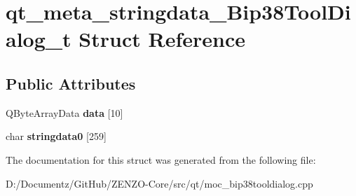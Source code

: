 \hypertarget{structqt__meta__stringdata___bip38_tool_dialog__t}{}\section{qt\+\_\+meta\+\_\+stringdata\+\_\+\+Bip38\+Tool\+Dialog\+\_\+t Struct Reference}
\label{structqt__meta__stringdata___bip38_tool_dialog__t}
\subsection*{Public Attributes}
\begin{DoxyCompactItemize}
\item 
\mbox{\label{structqt__meta__stringdata___bip38_tool_dialog__t_aa66a85840d0c5aae7f40a54980740b2a}} 
Q\+Byte\+Array\+Data {\bfseries data} \mbox{[}10\mbox{]}
\item 
\mbox{\label{structqt__meta__stringdata___bip38_tool_dialog__t_aa6bf5da3a65ebcfd760018b1f311d955}} 
char {\bfseries stringdata0} \mbox{[}259\mbox{]}
\end{DoxyCompactItemize}


The documentation for this struct was generated from the following file\+:\begin{DoxyCompactItemize}
\item 
D\+:/\+Documentz/\+Git\+Hub/\+Z\+E\+N\+Z\+O-\/\+Core/src/qt/moc\+\_\+bip38tooldialog.\+cpp\end{DoxyCompactItemize}
